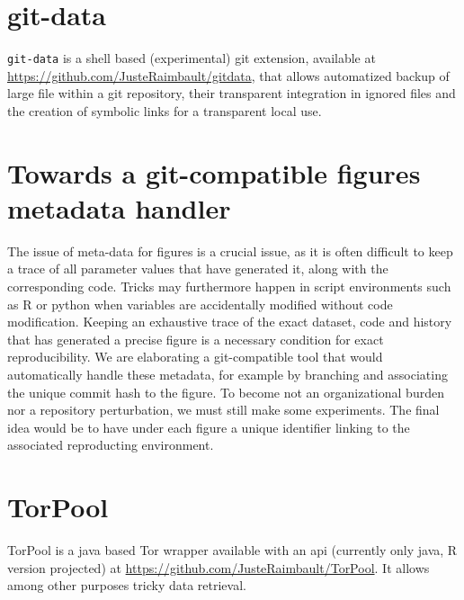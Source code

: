 \section{git-data}

\texttt{git-data} is a shell based (experimental) git extension, available at \url{https://github.com/JusteRaimbault/gitdata}, that allows automatized backup of large file within a git repository, their transparent integration in ignored files and the creation of symbolic links for a transparent local use.


\section{Towards a git-compatible figures metadata handler}

The issue of meta-data for figures is a crucial issue, as it is often difficult to keep a trace of all parameter values that have generated it, along with the corresponding code. Tricks may furthermore happen in script environments such as R or python when variables are accidentally modified without code modification. Keeping an exhaustive trace of the exact dataset, code and history that has generated a precise figure is a necessary condition for exact reproducibility. We are elaborating a git-compatible tool that would automatically handle these metadata, for example by branching and associating the unique commit hash to the figure. To become not an organizational burden nor a repository perturbation, we must still make some experiments. The final idea would be to have under each figure a unique identifier linking to the associated reproducting environment.


\section{TorPool}

TorPool is a java based Tor wrapper available with an api (currently only java, R version projected) at \url{https://github.com/JusteRaimbault/TorPool}. It allows among other purposes tricky data retrieval.

